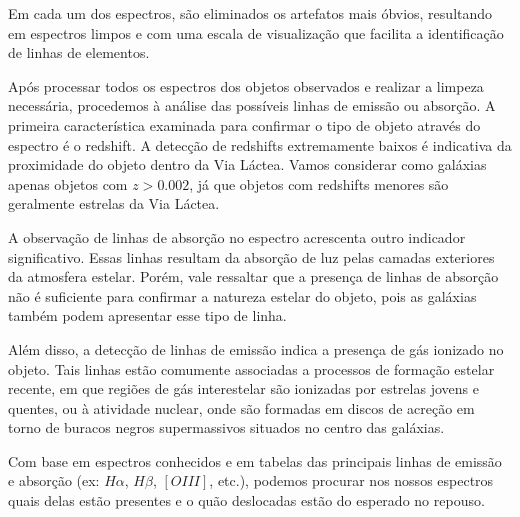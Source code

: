 Em cada um dos espectros, são eliminados os artefatos mais óbvios, resultando em espectros limpos e com uma escala de visualização que facilita a identificação de linhas de elementos.

Após processar todos os espectros dos objetos observados e realizar a limpeza necessária, procedemos à análise das possíveis linhas de emissão ou absorção. A primeira característica examinada para confirmar o tipo de objeto através do espectro é o redshift. A detecção de redshifts extremamente baixos é indicativa da proximidade do objeto dentro da Via Láctea. Vamos considerar como galáxias apenas objetos com $z > 0.002$, já que objetos com redshifts menores são geralmente estrelas da Via Láctea.

A observação de linhas de absorção no espectro acrescenta outro indicador significativo. Essas linhas resultam da absorção de luz pelas camadas exteriores da atmosfera estelar. Porém, vale ressaltar que a presença de linhas de absorção não é suficiente para confirmar a natureza estelar do objeto, pois as galáxias também podem apresentar esse tipo de linha.

Além disso, a detecção de linhas de emissão indica a presença de gás ionizado no objeto. Tais linhas estão comumente associadas a processos de formação estelar recente, em que regiões de gás interestelar são ionizadas por estrelas jovens e quentes, ou à atividade nuclear, onde são formadas em discos de acreção em torno de buracos negros supermassivos situados no centro das galáxias.



Com base em espectros conhecidos e em tabelas das principais linhas de emissão e absorção (ex: $H\alpha$, $H\beta$, $[OIII]$, etc.), podemos procurar nos nossos espectros quais delas estão presentes e o quão deslocadas estão do esperado no repouso.

